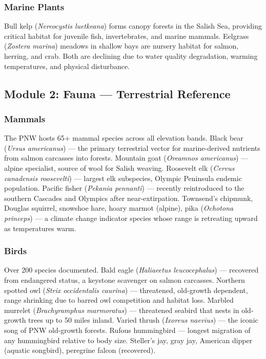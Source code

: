 \documentclass[11pt,letterpaper]{article}
\begin{document}
\subsubsection{Marine Plants}

Bull kelp (\emph{Nereocystis luetkeana}) forms canopy forests in the Salish Sea, providing critical habitat for juvenile fish, invertebrates, and marine mammals. Eelgrass (\emph{Zostera marina}) meadows in shallow bays are nursery habitat for salmon, herring, and crab. Both are declining due to water quality degradation, warming temperatures, and physical disturbance.

\subsection{Module 2: Fauna --- Terrestrial Reference}

\subsubsection{Mammals}

The PNW hosts 65+ mammal species across all elevation bands. Black bear (\emph{Ursus americanus}) --- the primary terrestrial vector for marine-derived nutrients from salmon carcasses into forests. Mountain goat (\emph{Oreamnos americanus}) --- alpine specialist, source of wool for Salish weaving. Roosevelt elk (\emph{Cervus canadensis roosevelti}) --- largest elk subspecies, Olympic Peninsula endemic population. Pacific fisher (\emph{Pekania pennanti}) --- recently reintroduced to the southern Cascades and Olympics after near-extirpation. Townsend's chipmunk, Douglas squirrel, snowshoe hare, hoary marmot (alpine), pika (\emph{Ochotona princeps}) --- a climate change indicator species whose range is retreating upward as temperatures warm.

\subsubsection{Birds}

Over 200 species documented. Bald eagle (\emph{Haliaeetus leucocephalus}) --- recovered from endangered status, a keystone scavenger on salmon carcasses. Northern spotted owl (\emph{Strix occidentalis caurina}) --- threatened, old-growth dependent, range shrinking due to barred owl competition and habitat loss. Marbled murrelet (\emph{Brachyramphus marmoratus}) --- threatened seabird that nests in old-growth trees up to 50 miles inland. Varied thrush (\emph{Ixoreus naevius}) --- the iconic song of PNW old-growth forests. Rufous hummingbird --- longest migration of any hummingbird relative to body size. Steller's jay, gray jay, American dipper (aquatic songbird), peregrine falcon (recovered).
\end{document}
